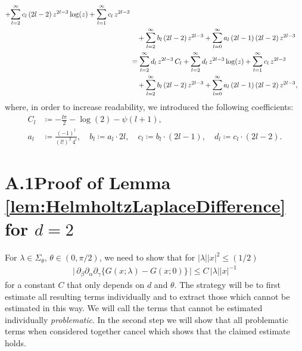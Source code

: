 \begin{align*}
  +  \mathlarger{\sum}_{l = 2}^\infty \, c_l \, (2l - 2) \, z^{2l - 3} \log(z) 
  +  \mathlarger{\sum}_{l = 1}^\infty \, c_l \, z^{2l - 3} \\
 &\quad  
  + \mathlarger{\sum}_{l = 2}^\infty \, b_l \, (2l - 2) \, z^{2l - 3} 
  + \mathlarger{\sum}_{l = 0}^\infty \, a_l \, (2l - 1) \, (2l - 2) \, z^{2l - 3} \\
  &= \mathlarger{\sum}_{l = 2}^\infty \, d_l \, z^{2l - 3} \, C_l 
  + \mathlarger{\sum}_{l = 2}^\infty \, d_l \, z^{2l - 3} \log(z) 
  + \mathlarger{\sum}_{l = 1}^\infty \, c_l \, z^{2l - 3} \\
 &\quad  + \mathlarger{\sum}_{l = 2}^\infty \, b_l \, (2l - 2) \, z^{2l - 3} 
  + \mathlarger{\sum}_{l = 0}^\infty \, a_l \, (2l - 1)\, (2l - 2) \, z^{2l - 3} ,
\end{align*}
where, in order to increase readability, we introduced the following coefficients:
\begin{align*}
  C_l &\coloneqq -\frac{\ii \pi}{2} - \log(2) - \psi(l + 1), \\
  a_l &\coloneqq \frac{(-1)^l}{(l!)^2 \, 4^l}, \quad
  b_l \coloneqq a_l \cdot  2l, \quad
  c_l \coloneqq b_l \cdot (2l - 1), \quad
  d_l \coloneqq c_l \cdot (2l - 2).
\end{align*}

\section*{A.1\quad Proof of Lemma \ref{lem:HelmholtzLaplaceDifference} for $d = 2$}
\label{sec:A1}

For $\lambda \in \Sigma_\theta$, $\theta \in (0, \pi/2)$, we need to show that for $|\lambda| |x|^2 \leq (1/2)$
\begin{align*}
  \Big|\, \partial_\beta \partial_\alpha \partial_\gamma \big\{ G(x; \lambda) - G(x; 0) \big\} \, \Big|
  \leq C\, |\lambda| |x|^{-1}
\end{align*}
for a constant $C$ that only depends on $d$ and $\theta$.
The strategy will be to first estimate all resulting terms individually and to extract those which cannot be estimated in this way.
We will call the terms that cannot be estimated individually \emph{problematic}.
In the second step we will show that  all problematic terms when considered together cancel which shows that the claimed estimate holds.

